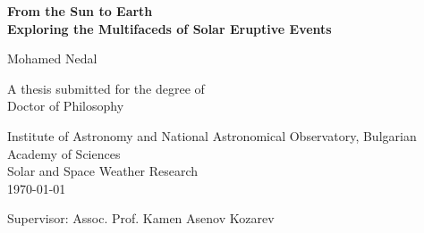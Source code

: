\begin{titlepage}
    \begin{center}
        \vspace*{1cm}
        
        \Huge
        \textbf{From the Sun to Earth\\Exploring the Multifaceds of Solar Eruptive Events}
        
        \vspace{1.5cm}
        
        \LARGE
        Mohamed Nedal
        
        \vfill
        
        A thesis submitted for the degree of\\
        Doctor of Philosophy
        
        \vspace{0.8cm}
        
        \Large
        Institute of Astronomy and National Astronomical Observatory, Bulgarian Academy of Sciences\\
        Solar and Space Weather Research\\
        \today
        
        \vspace{0.8cm}
        
        Supervisor: Assoc. Prof. Kamen Asenov Kozarev
        
    \end{center}
\end{titlepage}
